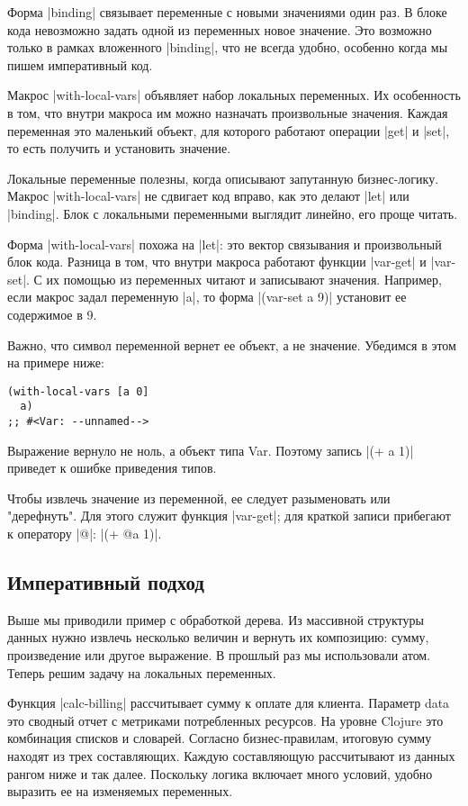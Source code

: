 {{{{{{{{Форма \spverb|binding| связывает переменные с новыми значениями один раз. В блоке кода
невозможно задать одной из переменных новое значение. Это возможно только в
рамках вложенного \spverb|binding|, что не всегда удобно, особенно когда мы пишем
императивный код.

Макрос \spverb|with-local-vars| объявляет набор локальных переменных. Их особенность в
том, что внутри макроса им можно назначать произвольные значения. Каждая
переменная это маленький объект, для которого работают операции \spverb|get| и \spverb|set|,
то есть получить и установить значение.

Локальные переменные полезны, когда описывают запутанную бизнес-логику. Макрос
\spverb|with-local-vars| не сдвигает код вправо, как это делают \spverb|let| или
\spverb|binding|. Блок с локальными переменными выглядит линейно, его проще читать.

Форма \spverb|with-local-vars| похожа на \spverb|let|: это вектор связывания и произвольный
блок кода. Разница в том, что внутри макроса работают функции \spverb|var-get| и
\spverb|var-set|. С их помощью из переменных читают и записывают значения. Например,
если макрос задал переменную \spverb|a|, то форма \spverb|(var-set a 9)| установит ее
содержимое в 9.

Важно, что символ переменной вернет ее объект, а не значение. Убедимся в этом на
примере ниже:

\begin{verbatim}
(with-local-vars [a 0]
  a)
;; #<Var: --unnamed-->
\end{verbatim}

Выражение вернуло не ноль, а объект типа Var. Поэтому запись \spverb|(+ a 1)| приведет
к ошибке приведения типов.

Чтобы извлечь значение из переменной, ее следует разыменовать или
"дерефнуть". Для этого служит функция \spverb|var-get|; для краткой записи прибегают к
оператору \spverb|@|: \spverb|(+ @a 1)|.

\subsection{Императивный подход}

Выше мы приводили пример с обработкой дерева. Из массивной структуры данных
нужно извлечь несколько величин и вернуть их композицию: сумму, произведение или
другое выражение. В прошлый раз мы использовали атом. Теперь решим задачу на
локальных переменных.

Функция \spverb|calc-billing| рассчитывает сумму к оплате для клиента. Параметр data
это сводный отчет с метриками потребленных ресурсов. На уровне Clojure это
комбинация списков и словарей. Согласно бизнес-правилам, итоговую сумму находят
из трех составляющих. Каждую составляющую рассчитывают из данных рангом ниже и
так далее. Поскольку логика включает много условий, удобно выразить ее на
изменяемых переменных.

}}}}}}}}
